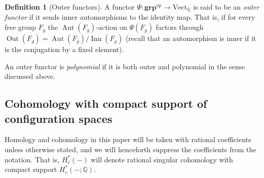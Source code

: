 \documentclass[12pt]{article}
\newcommand{\Q}{\mathbb{Q}}
\newcommand{\Schur}[1]{\mathbb{S}_{#1}}
\newcommand{\Vect}[1]{\textrm{Vect}_{#1}}
\DeclareMathOperator{\Aut}{Aut}
\DeclareMathOperator{\Out}{Out}
\theoremstyle{plain}
\theoremstyle{definition}
\newtheorem{defi}[thm]{Definition}
\theoremstyle{remark}
\begin{document}
\begin{defi}[Outer functors]\label{def:outer-functor}
    A functor $\Psi: \bm{grp}^{op}\to\Vect{\Q}$ is said to be an \emph{outer functor} if it sends inner automorphisms to the identity map. That is, if for every free group $F_g$ the $\Aut(F_g)$-action on $\Psi(F_g)$ factors through $\Out(F_g) = \Aut(F_g)/\operatorname{Inn}(F_g)$ (recall that an automorphism is inner if it is the conjugation by a fixed element).

    An outer functor is \emph{polynomial} if it is both outer and polynomial in the sense discussed above.

\end{defi}

\subsection{Cohomology with compact support of configuration spaces}\label{sec:configurations with compact support}

Homology and cohomology in this paper will be taken with rational coefficients unless otherwise stated, and we will henceforth suppress the coefficients from the notation. That is, $H^*_c(-)$ will denote rational singular cohomology with compact support $H^*_c(-;\Q)$. %
\end{document}
